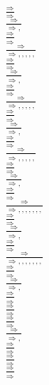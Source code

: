 \documentclass[11pt]{article}
\begin{document}
\begin{center}
\bigskip
\\$\frac{\Rightarrow }{\Rightarrow }$
\bigskip
\\$\frac{\Rightarrow }{\Rightarrow , }$
\bigskip
\\$\frac{\Rightarrow }{\Rightarrow }$
\bigskip
\\$\frac{\Rightarrow }{\Rightarrow , , , , , }$
\bigskip
\\$\frac{\Rightarrow }{\Rightarrow }$
\bigskip
\\$\frac{\Rightarrow }{\Rightarrow , }$
\bigskip
\\$\frac{\Rightarrow }{\Rightarrow }$
\bigskip
\\$\frac{\Rightarrow }{\Rightarrow , , , , , }$
\bigskip
\\$\frac{\Rightarrow }{\Rightarrow }$
\bigskip
\\$\frac{\Rightarrow }{\Rightarrow , }$
\bigskip
\\$\frac{\Rightarrow }{\Rightarrow }$
\bigskip
\\$\frac{\Rightarrow }{\Rightarrow , , , , , }$
\bigskip
\\$\frac{\Rightarrow }{\Rightarrow }$
\bigskip
\\$\frac{\Rightarrow }{\Rightarrow , }$
\bigskip
\\$\frac{\Rightarrow }{\Rightarrow }$
\bigskip
\\$\frac{\Rightarrow }{\Rightarrow , , , , , , , }$
\bigskip
\\$\frac{\Rightarrow }{\Rightarrow }$
\bigskip
\\$\frac{\Rightarrow }{\Rightarrow , }$
\bigskip
\\$\frac{\Rightarrow }{\Rightarrow }$
\bigskip
\\$\frac{\Rightarrow }{\Rightarrow , , , , , , , }$
\bigskip
\\$\frac{\Rightarrow }{\Rightarrow }$
\bigskip
\\$\frac{\Rightarrow }{\Rightarrow , }$
\bigskip
\\$\frac{\Rightarrow }{\Rightarrow }$
\bigskip
\\$\frac{\Rightarrow }{\Rightarrow }$
\bigskip
\\$\frac{\Rightarrow }{\Rightarrow }$
\bigskip
\\$\frac{\Rightarrow }{\Rightarrow , }$
\bigskip
\\$\frac{\Rightarrow }{\Rightarrow }$
\bigskip
\\$\frac{\Rightarrow }{\Rightarrow }$
\bigskip
\\$\frac{\Rightarrow }{\Rightarrow }$
\bigskip

\end{center}
\end{document}
